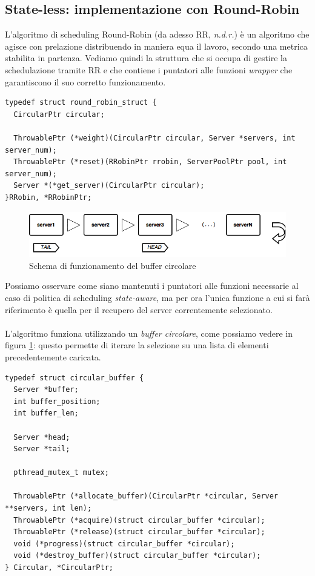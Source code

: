 \documentclass[italian]{tktltiki2}
\begin{document}
\subsection{State-less: implementazione con Round-Robin}
L'algoritmo di scheduling Round-Robin (da adesso RR, \emph{n.d.r.}) è un algoritmo che agisce con prelazione distribuendo in maniera equa il lavoro, secondo una metrica stabilita in partenza. Vediamo quindi la struttura che si occupa di gestire la schedulazione tramite RR e che contiene i puntatori alle funzioni \emph{wrapper} che garantiscono il suo corretto funzionamento.
\begin{lstlisting}
typedef struct round_robin_struct {
  CircularPtr circular;

  ThrowablePtr (*weight)(CircularPtr circular, Server *servers, int server_num);
  ThrowablePtr (*reset)(RRobinPtr rrobin, ServerPoolPtr pool, int server_num);
  Server *(*get_server)(CircularPtr circular);
}RRobin, *RRobinPtr;

\end{lstlisting}
\begin{figure}[b]
\centering
\includegraphics[width=\textwidth]{images/rrobin_stateless}
\caption{Schema di funzionamento del buffer circolare \label{fig: rrobin_sl}}
\end{figure}
Possiamo osservare come siano mantenuti i puntatori alle funzioni necessarie al caso di politica di scheduling \emph{state-aware}, ma per ora l'unica funzione a cui si farà riferimento è quella per il recupero del server correntemente selezionato. \\\\
L'algoritmo funziona utilizzando un \emph{buffer circolare}, come possiamo vedere in figura \ref{fig: rrobin_sl}: questo permette di iterare la selezione su una lista di elementi precedentemente caricata. 
\begin{lstlisting}
typedef struct circular_buffer {
  Server *buffer;
  int buffer_position;
  int buffer_len;
  
  Server *head;
  Server *tail;

  pthread_mutex_t mutex;

  ThrowablePtr (*allocate_buffer)(CircularPtr *circular, Server **servers, int len);
  ThrowablePtr (*acquire)(struct circular_buffer *circular);
  ThrowablePtr (*release)(struct circular_buffer *circular);
  void (*progress)(struct circular_buffer *circular);
  void (*destroy_buffer)(struct circular_buffer *circular);
} Circular, *CircularPtr;
\end{lstlisting}
\end{document}

